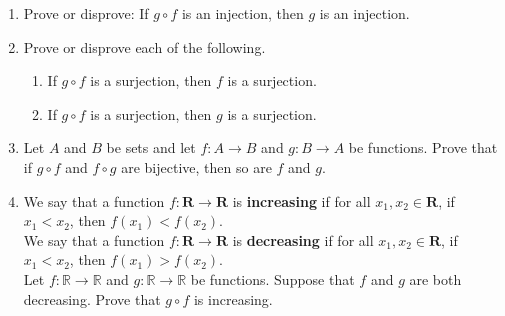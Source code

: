  \begin{enumerate}
 \item Prove or disprove: If $g\circ f$ is an injection, then $g$ is an injection.
   

 \item Prove or disprove each of the following. 
 \begin{enumerate}   
 \item If $g\circ f$ is a surjection, then $f$ is a surjection.
 \item If $g\circ f$ is a surjection, then $g$ is a surjection.
 \end{enumerate}
 
\item Let $A$ and $B$ be sets and let $f \colon A \to B$ and $g \colon B \to A$ be functions. Prove that if $g \circ f$ and $f \circ g$ are bijective, then so are $f$ and $g$.


  
\item We say that a function $f\colon \mathbf{R} \to \mathbf{R}$ is \textbf{increasing} if for all $x_1,x_2 \in \mathbf{R}$, if $x_1 < x_2$, then $f(x_1) < f(x_2)$.\\

We say that a function $f\colon \mathbf{R} \to \mathbf{R}$ is \textbf{decreasing} if for all $x_1,x_2 \in \mathbf{R}$, if $x_1 < x_2$, then $f(x_1) > f(x_2)$.\\  

  Let $f \colon \mathbb{R} \to \mathbb{R}$ and $g \colon \mathbb{R} \to \mathbb{R}$ be functions. Suppose that $f$ and $g$ are both decreasing. Prove that $g \circ f$ is increasing.
 \end{enumerate}


